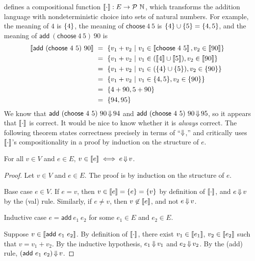 { defines a compositional function $\left\llbracket{\cdot}\right\rrbracket : E \to \mathcal{P}~\mathbb{N}$, which transforms the addition language with nondeterministic choice into sets of natural numbers.
For example, the meaning of $4$ is $\{{4}\}$, the meaning of $\mathsf{choose}~4~5$ is $\{{4}\} \cup \{{5}\} = \{{4,5}\}$, and the meaning of $\mathsf{add}~(\mathsf{choose}~4~5)~90$ is
\begin{equation}
\begin{aligned}
	\left\llbracket{\mathsf{add}~(\mathsf{choose}~4~5)~90}\right\rrbracket
	&\ =\ \lbrace {v_1 + v_2} \ \lvert\ {v_1 \in \left\llbracket{\mathsf{choose}~4~5}\right\rrbracket, v_2 \in \left\llbracket{90}\right\rrbracket} \rbrace
\\
	&\ =\ \lbrace {v_1 + v_2} \ \lvert\ {v_1 \in (\left\llbracket{4}\right\rrbracket \cup \left\llbracket{5}\right\rrbracket), v_2 \in \left\llbracket{90}\right\rrbracket} \rbrace 
\\
	&\ =\ \lbrace {v_1 + v_2} \ \lvert\ {v_1 \in (\{{4}\} \cup \{{5}\}), v_2 \in \{{90}\}} \rbrace
\\
	&\ =\ \lbrace {v_1 + v_2} \ \lvert\ {v_1 \in \{{4,5}\}, v_2 \in \{{90}\}} \rbrace
\\
	&\ =\ \{{4+90,5+90}\}
\\
	&\ =\ \{{94,95}\}
\end{aligned}
\end{equation}
We know that $\mathsf{add}~(\mathsf{choose}~4~5)~90 \operatorname{\Downarrow} 94$ and $\mathsf{add}~(\mathsf{choose}~4~5)~90 \operatorname{\Downarrow} 95$, so it appears that $\left\llbracket{\cdot}\right\rrbracket$ is correct.
It would be nice to know whether it is \emph{always} correct.
The following theorem states correctness precisely in terms of ``$\operatorname{\Downarrow}$,'' and critically uses $\left\llbracket{\cdot}\right\rrbracket$'s compositionality in a proof by induction on the structure of $e$.

\begin{theorem}
For all $v \in V$ and $e \in E$, $v \in \left\llbracket{e}\right\rrbracket \iff e \operatorname{\Downarrow} v$.
\end{theorem}
\begin{proof}
Let $v \in V$ and $e \in E$.
The proof is by induction on the structure of $e$.

Base case $e \in V$.
If $e = v$, then $v \in \left\llbracket{e}\right\rrbracket = \{{e}\} = \{{v}\}$ by definition of $\left\llbracket{\cdot}\right\rrbracket$, and $e \operatorname{\Downarrow} v$ by the (val) rule.
Similarly, if $e \neq v$, then $v \not\in \left\llbracket{e}\right\rrbracket$, and not $e \operatorname{\Downarrow} v$.

Inductive case $e = \mathsf{add}~e_1~e_2$ for some $e_1 \in E$ and $e_2 \in E$.

Suppose $v \in \left\llbracket{\mathsf{add}~e_1~e_2}\right\rrbracket$.
By definition of $\left\llbracket{\cdot}\right\rrbracket$, there exist $v_1 \in \left\llbracket{e_1}\right\rrbracket$, $v_2 \in \left\llbracket{e_2}\right\rrbracket$ such that $v = v_1 + v_2$.
By the inductive hypothesis, $e_1 \operatorname{\Downarrow} v_1$ and $e_2 \operatorname{\Downarrow} v_2$.
By the (add) rule, $(\mathsf{add}~e_1~e_2) \operatorname{\Downarrow} v$.


\end{proof}}
